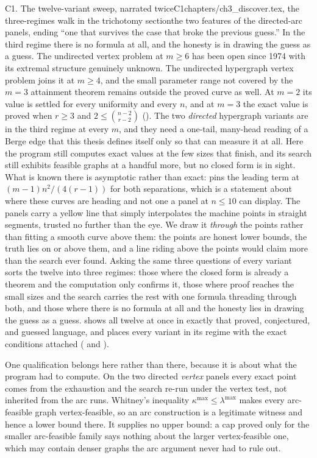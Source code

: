 \begin{offcutrewrite}{C1. The twelve-variant sweep, narrated twice}{C1}{chapters/ch3\_discover.tex, the three-regimes walk in the trichotomy section}{the two features of the directed-arc panels, ending ``one that survives the case that broke the previous guess.''}
In the third regime there is no formula at all, and the honesty is in drawing the guess as a guess. The undirected vertex problem at $m \ge 6$ has been open since 1974 with its extremal structure genuinely unknown. The undirected hypergraph vertex problem joins it at $m\ge4$, and the small parameter range not covered by the $m=3$ attainment theorem remains outside the proved curve as well. At $m=2$ its value is settled for every uniformity and every $n$, and at $m=3$ the exact value is proved when $r\ge3$ and $2\le\binom{n-2}{r-2}$ (). The two \emph{directed} hypergraph variants are in the third regime at every $m$, and they need a one-tail, many-head reading of a Berge edge that this thesis defines itself only so that  can measure it at all. Here the program still computes exact values at the few sizes that finish, and its search still exhibits feasible graphs at a handful more, but no closed form is in sight. What is known there is asymptotic rather than exact:  pins the leading term at $(m-1)n^2/(4(r-1))$ for both separations, which is a statement about where these curves are heading and not one a panel at $n \le 10$ can display. The panels carry a yellow line that simply interpolates the machine points in straight segments, trusted no further than the eye. We draw it \emph{through} the points rather than fitting a smooth curve above them: the points are honest lower bounds, the truth lies on or above them, and a line riding above the points would claim more than the search ever found.
\nowreads
Asking the same three questions of every variant sorts the twelve into three regimes: those where the closed form is already a theorem and the computation only confirms it, those where proof reaches the small sizes and the search carries the rest with one formula threading through both, and those where there is no formula at all and the honesty lies in drawing the guess as a guess.  shows all twelve at once in exactly that proved, conjectured, and guessed language, and  places every variant in its regime with the exact conditions attached ( and ).

One qualification belongs here rather than there, because it is about what the program had to compute. On the two directed \emph{vertex} panels every exact point comes from the exhaustion and the search re-run under the vertex test, not inherited from the arc runs. Whitney's inequality $\kappa^{\max} \le \lambda^{\max}$ makes every arc-feasible graph vertex-feasible, so an arc construction is a legitimate witness and hence a lower bound there. It supplies no upper bound: a cap proved only for the smaller arc-feasible family says nothing about the larger vertex-feasible one, which may contain denser graphs the arc argument never had to rule out.
\end{offcutrewrite}

